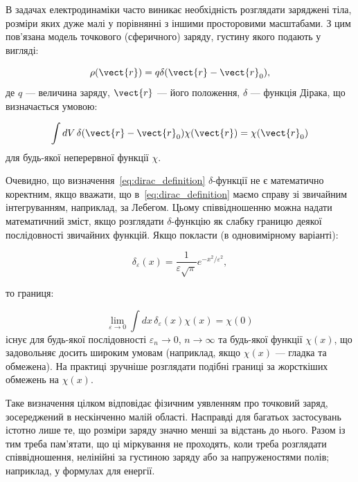 В задачах електродинаміки часто виникає необхідність розглядати заряджені тіла, розміри яких дуже малі у порівнянні з іншими просторовими масштабами. З
цим пов'язана модель точкового (сферичного) заряду, густину якого подають у вигляді:

\begin{equation}
\rho(\vect{r}) = q \delta(\vect{r} - \vect{r}_0),
\end{equation}
%
де \( q \) --- величина заряду, \( \vect{r} \) --- його положення, \( \delta \) --- функція Дірака, що визначається умовою:

\begin{equation}
\int dV \, \delta(\vect{r} - \vect{r}_0) \chi(\vect{r}) = \chi(\vect{r}_0)
\label{eq:dirac_definition}
\end{equation}
%
для будь-якої неперервної функції \( \chi \).

Очевидно, що визначення~\eqref{eq:dirac_definition} \(\delta\)-функції не є математично коректним, якщо вважати, що в~\eqref{eq:dirac_definition} маємо
справу зі звичайним інтегруванням, наприклад, за Лебегом. Цьому співвідношенню можна надати математичний зміст, якщо розглядати \(\delta\)-функцію як
слабку границю деякої послідовності звичайних функцій. Якщо покласти (в одновимірному варіанті):

\begin{equation}
\delta_{\varepsilon}(x) = \frac{1}{\varepsilon \sqrt{\pi}} e^{-x^2 / \varepsilon^2},
\label{eq:delta_sequence}
\end{equation}

то границя:

\begin{equation}
\lim_{\varepsilon \to 0} \int dx \, \delta_{\varepsilon}(x) \chi(x) = \chi(0)
\label{eq:delta_limit}
\end{equation}
існує для будь-якої послідовності \( \varepsilon_n \to 0 \), \( n \to \infty \) та будь-якої функції \( \chi(x) \), що задовольняє досить широким умовам
(наприклад, якщо \( \chi(x) \) --- гладка та обмежена). На практиці зручніше розглядати подібні границі за жорсткіших обмежень на \( \chi(x) \).

Таке визначення цілком відповідає фізичним уявленням про точковий заряд, зосереджений в нескінченно малій області. Насправді для багатьох застосувань
істотно лише те, що розміри заряду значно менші за відстань до нього. Разом із тим треба пам'ятати, що ці міркування не проходять, коли треба розглядати
співвідношення, нелінійні за густиною заряду або за напруженостями полів; наприклад, у формулах для енергії.

